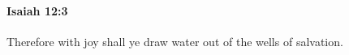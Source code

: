 
		\paragraph{Isaiah 12:3} %
			\label{ISAIAH-12-3}

			Therefore with joy shall ye draw water out of the wells of salvation.


